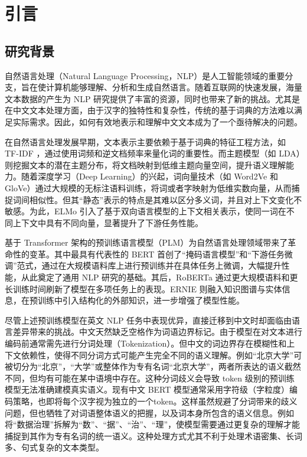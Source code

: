 \documentclass[12pt, a4paper]{ctexart}
\begin{document}
\section{引言}
\subsection{研究背景}
自然语言处理（Natural Language Processing，NLP）是人工智能领域的重要分支，旨在使计算机能够理解、分析和生成自然语言。随着互联网的快速发展，海量文本数据的产生为 NLP 研究提供了丰富的资源，同时也带来了新的挑战。尤其是在中文文本处理方面，由于汉字的独特性和复杂性，传统的基于词典的方法难以满足实际需求。因此，如何有效地表示和理解中文文本成为了一个亟待解决的问题。

在自然语言处理发展早期，文本表示主要依赖于基于词典的特征工程方法，如 TF-IDF ，通过使用词频和逆文档频率来量化词的重要性\cite{SALTON1988513}。而主题模型（如 LDA）则挖掘文本的潜在主题分布，将文档映射到低维主题向量空间，提升语义理解能力\cite{10.5555/944919.944937}。随着深度学习（Deep Learning）的兴起，词向量技术（如 Word2Ve\cite{mikolov2013efficientestimationwordrepresentations} 和 GloVe\cite{pennington-etal-2014-glove}）通过大规模的无标注语料训练，将词或者字映射为低维实数向量，从而捕捉词间相似性。但其“静态”表示的特点是其难以区分多义词，并且对上下文变化不敏感。为此，ELMo 引入了基于双向语言模型的上下文相关表示，使同一词在不同上下文中具有不同向量，显著提升了下游任务性能\cite{peters-etal-2018-deep}。

基于 Transformer 架构的预训练语言模型（PLM）为自然语言处理领域带来了革命性的变革。其中最具有代表性的 BERT 首创了“掩码语言模型”和“下游任务微调”范式，通过在大规模语料库上进行预训练并在具体任务上微调，大幅提升性能，从此奠定了通用 NLP 研究的基础\cite{devlin-etal-2019-bert}。其后，RoBERTa 通过更大规模语料和更长训练时间刷新了模型在多项任务上的表现\cite{liu2019robertarobustlyoptimizedbert}。ERNIE 则融入知识图谱与实体信息，在预训练中引入结构化的外部知识，进一步增强了模型性能\cite{sun2019ernieenhancedrepresentationknowledge}。

尽管上述预训练模型在英文 NLP 任务中表现优异，直接迁移到中文时却面临由语言差异带来的挑战。中文天然缺乏空格作为词语边界标记。由于模型在对文本进行编码前通常需先进行分词处理（Tokenization）。但中文的词边界存在模糊性和上下文依赖性，使得不同分词方式可能产生完全不同的语义理解。例如“北京大学”可被切分为“北京”，“大学”或整体作为专有名词“北京大学”，两者所表达的语义截然不同，但均有可能在某中语境中存在。这种分词歧义会导致 token 级别的预训练模型无法准确建模真实语义。现有中文 BERT 模型通常采用字符级（字粒度）编码策略，也即将每个汉字视为独立的一个token。这样虽然规避了分词带来的歧义问题，但也牺牲了对词语整体语义的把握，以及词本身所包含的语义信息。例如将“数据治理”拆解为“数”、“据”、“治”、“理”，使模型需要通过更复杂的理解才能捕捉到其作为专有名词的统一语义。这种处理方式尤其不利于处理术语密集、长词多、句式复杂的文本类型。
\end{document}
